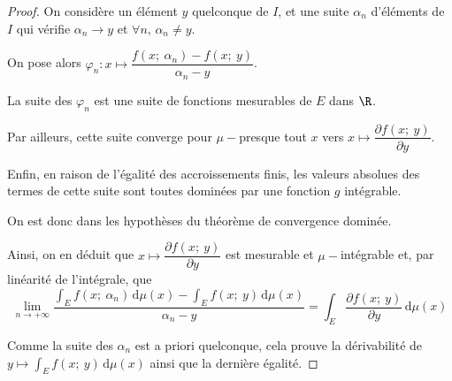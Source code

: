 \begin{proof}
On considère un élément $y$ quelconque de $I$, et une suite $\alpha_n$ d'éléments de $I$ qui vérifie $\alpha_n \to y$ et $\forall n, \, \alpha_n \neq y$.

On pose alors $\varphi_{n}: x \mapsto \dfrac{f\left(x;~\alpha_n\right)-f\left(x;~y\right)}{\alpha_n-y}$.

La suite des $\varphi_{n}$ est une suite de fonctions mesurables de $E$ dans $\R$. 

Par ailleurs, cette suite converge pour $\mu-$presque tout $x$ vers $x \mapsto \dfrac{\partial f(x;~y)}{\partial y}$.

Enfin, en raison de l'égalité des accroissements finis, les valeurs absolues des termes de cette suite sont toutes dominées par une fonction $g$ intégrable.

On est donc dans les hypothèses du théorème de convergence dominée.

Ainsi, on en déduit que $x \mapsto \dfrac{\partial f(x;~y)}{\partial y}$ est mesurable et $\mu-$intégrable et, par linéarité de l'intégrale, que 
\[
\lim \limits_{n \to +\infty} \dfrac{\displaystyle{\int}_E  f\left(x;~\alpha_n\right) \, \mathrm d \mu(x) - \displaystyle{\int}_E  f\left(x;~y\right) \, \mathrm d \mu(x)}{\alpha_n-y} = \displaystyle{\int}_E  \dfrac{\partial f(x;~y)}{\partial y}  \, \mathrm d \mu(x)
\]

Comme la suite des $\alpha_n$ est a priori quelconque, cela prouve la dérivabilité de $y \mapsto \displaystyle{\int}_E f(x;~y) \, \mathrm d \mu(x)$ ainsi que la dernière égalité.
\end{proof}



